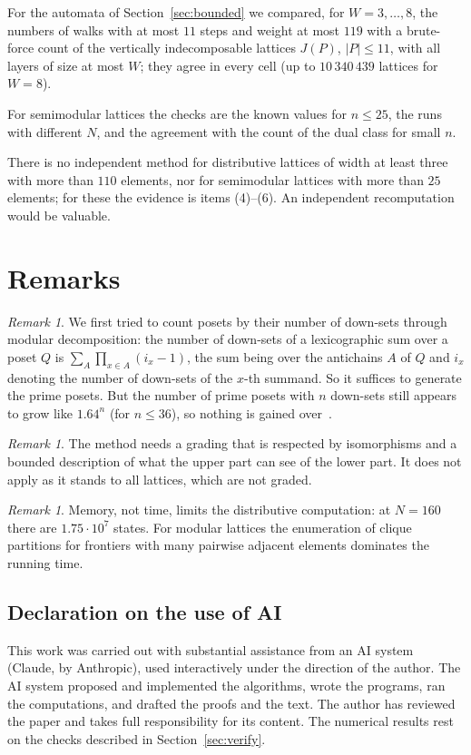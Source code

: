 \documentclass[11pt]{amsart}
\theoremstyle{definition}
\theoremstyle{remark}
\newtheorem{remark}[theorem]{Remark}
\begin{document}
For the automata of Section~\ref{sec:bounded} we compared, for $W = 3,\dots,8$, the numbers of
walks with at most $11$ steps and weight at most $119$ with a brute-force count of the
vertically indecomposable lattices $J(P)$, $|P| \le 11$, with all layers of size at most $W$;
they agree in every cell (up to $10\,340\,439$ lattices for $W = 8$).

For semimodular lattices the checks are the known values for $n \le 25$, the runs with
different $N$, and the agreement with the count of the dual class for small $n$.

There is no independent method for distributive lattices of width at least three with more than
$110$ elements, nor for semimodular lattices with more than $25$ elements; for
these the evidence is items (4)--(6).  An independent recomputation would be valuable.

\section{Remarks}

\begin{remark}
We first tried to count posets by their number of down-sets through modular
decomposition: the number of down-sets of a lexicographic sum over a poset $Q$ is
$\sum_{A} \prod_{x \in A} (i_x - 1)$, the sum being over the antichains $A$ of $Q$ and $i_x$
denoting the number of down-sets of the $x$-th summand.  So it suffices to generate the prime
posets.  But the number of prime posets with $n$ down-sets still appears to grow like
$1.64^n$ (for $n \le 36$), so nothing is gained over~\cite{Koh21}.
\end{remark}

\begin{remark}
The method needs a grading that is respected by isomorphisms and a bounded description
of what the upper part can see of the lower part.  It does not apply as it stands to
all lattices, which are not graded.
\end{remark}

\begin{remark}
Memory, not time, limits the distributive computation: at $N = 160$ there are
$1.75 \cdot 10^7$ states.  For modular lattices the enumeration of clique partitions for
frontiers with many pairwise adjacent elements dominates the running time.
\end{remark}

\subsection*{Declaration on the use of AI}
This work was carried out with substantial assistance from an AI system (Claude, by
Anthropic), used interactively under the direction of the author.  The AI system proposed and
implemented the algorithms, wrote the programs, ran the computations, and drafted the proofs
and the text.  The author has reviewed the paper and takes full responsibility for its
content.  The numerical results rest on the checks described in Section~\ref{sec:verify}.
\end{document}
